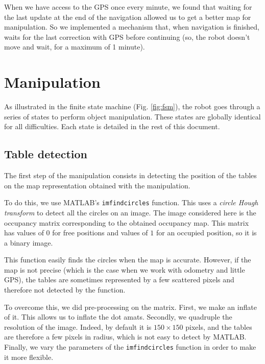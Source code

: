 \documentclass[a4paper, 10pt, conference]{ieeeconf}
\begin{document}
    When we have access to the GPS once every minute, we found that waiting for the last update at the end of the navigation allowed us to get a better map for manipulation. So we implemented a mechanism that, when navigation is finished, waits for the last correction with GPS before continuing (so, the robot doesn't move and wait, for a maximum of 1 minute).
    
    
    \section{Manipulation}\label{sec:manipulation}
    
    As illustrated in the finite state machine (Fig. \ref{fig:fsm}), the robot goes through a series of states to perform object manipulation. These states are globally identical for all difficulties. Each state is detailed in the rest of this document.
    
    \subsection{Table detection}
    
    The first step of the manipulation consists in detecting the position of the tables on the map representation obtained with the manipulation.
    
    To do this, we use MATLAB's \texttt{imfindcircles} function. This uses a \emph{circle Hough transform} to detect all the circles on an image. The image considered here is the occupancy matrix corresponding to the obtained occupancy map. This matrix has values of $0$ for free positions and values of $1$ for an occupied position, so it is a binary image.
    
    This function easily finds the circles when the map is accurate. However, if the map is not precise (which is the case when we work with odometry and little GPS), the tables are sometimes represented by a few scattered pixels and therefore not detected by the function.
    
    To overcome this, we did pre-processing on the matrix. First, we make an inflate of it. This allows us to inflate the dot amats. Secondly, we quadruple the resolution of the image. Indeed, by default it is $150\times150$ pixels, and the tables are therefore a few pixels in radius, which is not easy to detect by MATLAB. Finally, we vary the parameters of the \texttt{imfindcircles} function in order to make it more flexible.
    
\end{document}
